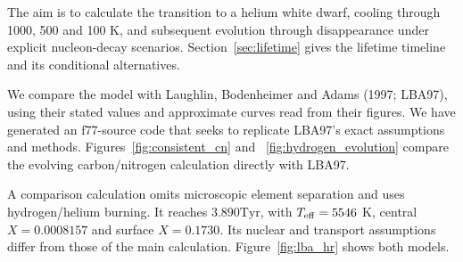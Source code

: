 \documentclass[11pt,letterpaper]{article}
\newcommand{\Tyr}{\mathrm{Tyr}}
\begin{document}
The aim is to calculate the transition to a helium white dwarf, cooling
through 1000, 500 and 100 K, and subsequent evolution through disappearance
under explicit nucleon-decay scenarios. Section~\ref{sec:lifetime} gives
the lifetime timeline and its conditional alternatives.

We compare the model with Laughlin, Bodenheimer and Adams (1997; LBA97),
using their stated values and approximate curves read from their figures.
We have generated an f77-source code that seeks to replicate LBA97's exact
assumptions and methods. Figures~\ref{fig:consistent_cn} and
~\ref{fig:hydrogen_evolution} compare the evolving carbon/nitrogen calculation
directly with LBA97.

A comparison calculation omits microscopic element separation and uses
hydrogen/helium burning. It reaches $3.890\Tyr$, with
$T_{\rm eff}=5546$ K, central $X=0.0008157$ and surface $X=0.1730$.
Its nuclear and transport assumptions differ from those of the main
calculation. Figure~\ref{fig:lba_hr} shows both models.
\end{document}
